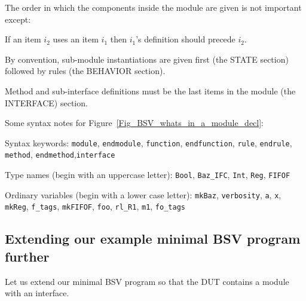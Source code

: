 The order in which the components inside the module are given is not
important except:

\begin{tightlist}

 \item If an item $i_2$ uses an item $i_1$ then $i_1$'s definition
       should precede $i_2$.

 \item By convention, sub-module instantiations are given first (the STATE section)
       followed by rules (the BEHAVIOR section).

 \item Method and sub-interface definitions must be the last items in
       the module (the INTERFACE) section.

\end{tightlist}

Some syntax notes for Figure~\ref{Fig_BSV_whats_in_a_module_decl}:

\begin{tightlist}

 \item Syntax keywords: \verb|module|, \verb|endmodule|,
       \verb|function|, \verb|endfunction|, \verb|rule|,
       \verb|endrule|, \verb|method|,
       \verb|endmethod|,\verb|interface|

 \item Type names (begin with an uppercase letter): \verb|Bool|,
       \verb|Baz_IFC|, \verb|Int|, \verb|Reg|, \verb|FIFOF|

 \item Ordinary variables (begin with a lower case letter): \verb|mkBaz|,
       \verb|verbosity|, \verb|a|, \verb|x|, \verb|mkReg|, \verb|f_tags|,
       \verb|mkFIFOF|,
       \verb|foo|,
       \verb|rl_R1|,
       \verb|m1|,
       \verb|fo_tags|

\end{tightlist}


\subsection{Extending our example minimal BSV program further}

Let us extend our minimal BSV program so that the DUT contains a
module with an interface.


